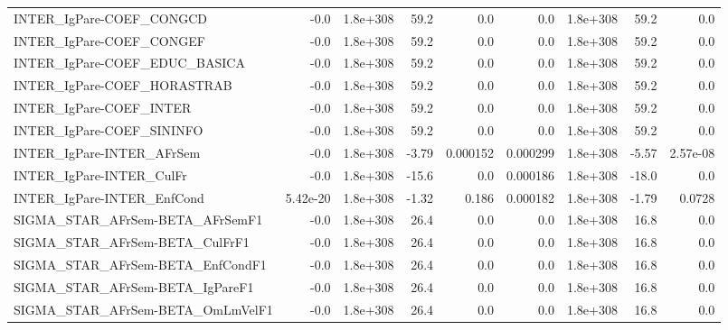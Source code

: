 \begin{tabular}{lrrrrrrrr}
INTER\_IgPare-COEF\_CONGCD              &        -0.0 &     1.8e+308 &    59.2 &      0.0 &        0.0 &    1.8e+308 &         59.2 &           0.0 \\
INTER\_IgPare-COEF\_CONGEF              &        -0.0 &     1.8e+308 &    59.2 &      0.0 &        0.0 &    1.8e+308 &         59.2 &           0.0 \\
INTER\_IgPare-COEF\_EDUC\_BASICA         &        -0.0 &     1.8e+308 &    59.2 &      0.0 &        0.0 &    1.8e+308 &         59.2 &           0.0 \\
INTER\_IgPare-COEF\_HORASTRAB           &        -0.0 &     1.8e+308 &    59.2 &      0.0 &        0.0 &    1.8e+308 &         59.2 &           0.0 \\
INTER\_IgPare-COEF\_INTER               &        -0.0 &     1.8e+308 &    59.2 &      0.0 &        0.0 &    1.8e+308 &         59.2 &           0.0 \\
INTER\_IgPare-COEF\_SININFO             &        -0.0 &     1.8e+308 &    59.2 &      0.0 &        0.0 &    1.8e+308 &         59.2 &           0.0 \\
INTER\_IgPare-INTER\_AFrSem             &        -0.0 &     1.8e+308 &   -3.79 & 0.000152 &   0.000299 &    1.8e+308 &        -5.57 &      2.57e-08 \\
INTER\_IgPare-INTER\_CulFr              &        -0.0 &     1.8e+308 &   -15.6 &      0.0 &   0.000186 &    1.8e+308 &        -18.0 &           0.0 \\
INTER\_IgPare-INTER\_EnfCond            &    5.42e-20 &     1.8e+308 &   -1.32 &    0.186 &   0.000182 &    1.8e+308 &        -1.79 &        0.0728 \\
SIGMA\_STAR\_AFrSem-BETA\_AFrSemF1       &        -0.0 &     1.8e+308 &    26.4 &      0.0 &        0.0 &    1.8e+308 &         16.8 &           0.0 \\
SIGMA\_STAR\_AFrSem-BETA\_CulFrF1        &        -0.0 &     1.8e+308 &    26.4 &      0.0 &        0.0 &    1.8e+308 &         16.8 &           0.0 \\
SIGMA\_STAR\_AFrSem-BETA\_EnfCondF1      &        -0.0 &     1.8e+308 &    26.4 &      0.0 &        0.0 &    1.8e+308 &         16.8 &           0.0 \\
SIGMA\_STAR\_AFrSem-BETA\_IgPareF1       &        -0.0 &     1.8e+308 &    26.4 &      0.0 &        0.0 &    1.8e+308 &         16.8 &           0.0 \\
SIGMA\_STAR\_AFrSem-BETA\_OmLmVelF1      &        -0.0 &     1.8e+308 &    26.4 &      0.0 &        0.0 &    1.8e+308 &         16.8 &           0.0 \\

\end{tabular}
